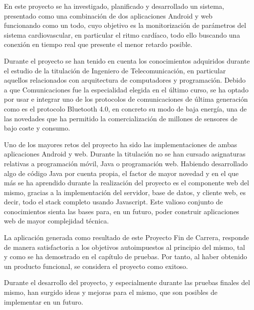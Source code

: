 \label{chp:concl}
    
    En este proyecto se ha investigado, planificado y desarrollado un sistema, presentado como una combinación de dos aplicaciones Android y web funcionando como un todo, cuyo objetivo es la monitorización de parámetros del sistema cardiovascular, en particular el ritmo cardíaco, todo ello buscando una conexión en tiempo real que presente el menor retardo posible.
    
    Durante el proyecto se han tenido en cuenta los conocimientos adquiridos durante el estudio de la titulación de Ingeniero de Telecomunicación, en particular aquellos relacionados con arquitectura de computadores y programación. Debido a que Comunicaciones fue la especialidad elegida en el último curso, se ha optado por usar e integrar uno de los protocolos de comunicaciones de última generación como es el protocolo Bluetooth 4.0, en concreto su modo de baja energía, una de las novedades que ha permitido la comercialización de millones de sensores de bajo coste y consumo.
    
    Uno de los mayores retos del proyecto ha sido las implementaciones de ambas aplicaciones Android y web. Durante la titulación no se han cursado asignaturas relativas a programación móvil, Java o programación web. Habiendo desarrollado algo de código Java por cuenta propia, el factor de mayor novedad y en el que más se ha aprendido durante la realización del proyecto es el componente web del mismo, gracias a la implementación del servidor, base de datos, y cliente web, es decir, todo el stack completo usando Javascript. Este valioso conjunto de conocimientos sienta las bases para, en un futuro, poder construir aplicaciones web de mayor complejidad técnica.
    
    La aplicación generada como resultado de este Proyecto Fin de Carrera, responde de manera satisfactoria a los objetivos autoimpuestos al principio del mismo, tal y como se ha demostrado en el capítulo de pruebas. Por tanto, al haber obtenido un producto funcional, se considera el proyecto como exitoso.
    
    Durante el desarrollo del proyecto, y especialmente durante las pruebas finales del mismo, han surgido ideas y mejoras para el mismo, que son posibles de implementar en un futuro.
     
